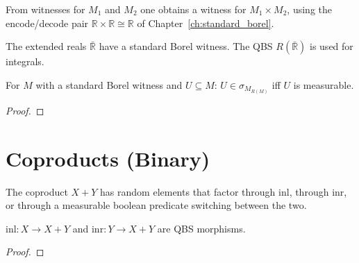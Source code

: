 \begin{definition}\label{def:prod_standard_borel}
  \rocqok
  From witnesses for $M_1$ and $M_2$ one obtains a witness for
  $M_1 \times M_2$, using the encode/decode pair
  $\mathbb{R} \times \mathbb{R} \cong \mathbb{R}$ of
  Chapter~\ref{ch:standard_borel}.
\end{definition}

\begin{definition}\label{def:ereal_standard_borel}
  \rocqok
  The extended reals $\bar{\mathbb{R}}$ have a standard Borel witness.
  The QBS $R(\bar{\mathbb{R}})$ is used for integrals.
\end{definition}

\begin{lemma}\label{lem:sigma_Mx_standard_borel}
  \rocqok
  For $M$ with a standard Borel witness and $U \subseteq M$:
  $U \in \sigma_{M_{R(M)}}$ iff $U$ is measurable.
\end{lemma}
\begin{proof}\rocqok\end{proof}


\section{Coproducts (Binary)}\label{sec:coproducts}

\begin{definition}\label{def:coprodQ}
  \rocqok
  The coproduct $X + Y$ has random elements that factor through
  $\mathrm{inl}$, through $\mathrm{inr}$, or through a measurable
  boolean predicate switching between the two.
\end{definition}

\begin{lemma}\label{lem:coproduct_injections}
  \rocqok
  $\mathrm{inl} : X \to X + Y$ and $\mathrm{inr} : Y \to X + Y$ are
  QBS morphisms.
\end{lemma}
\begin{proof}\rocqok\end{proof}

